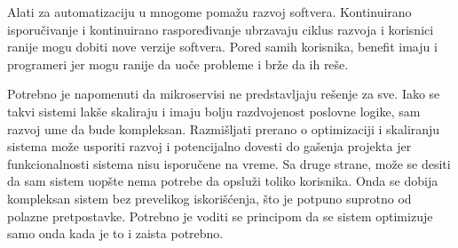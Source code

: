 Alati za automatizaciju u mnogome pomažu razvoj softvera. Kontinuirano isporučivanje 
i kontinuirano raspoređivanje ubrzavaju ciklus razvoja i korisnici ranije mogu dobiti 
nove verzije softvera. Pored samih korisnika, benefit imaju i programeri jer mogu 
ranije da uoče probleme i brže da ih reše.

Potrebno je napomenuti da mikroservisi ne predstavljaju rešenje za sve. Iako se takvi 
sistemi lakše skaliraju i imaju bolju razdvojenost poslovne logike, sam razvoj ume da 
bude kompleksan. Razmišljati prerano o optimizaciji i skaliranju sistema može usporiti 
razvoj i potencijalno dovesti do gašenja projekta jer funkcionalnosti sistema nisu 
isporučene na vreme. Sa druge strane, može se desiti da sam sistem uopšte nema potrebe 
da opsluži toliko korisnika. Onda se dobija kompleksan sistem bez prevelikog iskorišćenja,
što je potpuno suprotno od polazne pretpostavke. Potrebno je voditi se principom da se 
sistem optimizuje samo onda kada je to i zaista potrebno.
